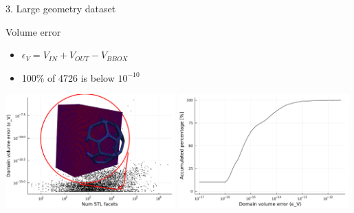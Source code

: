 \documentclass{beamer}
\begin{document}
\begin{frame}{3. Large geometry dataset}

  \begin{block}{Volume error}
  \begin{itemize}
    \item
      $\epsilon_V = V_{IN} + V_{OUT} - V_{BBOX}$
    \item
      100\% of 4726 is below $10^{-10}$
  \end{itemize}
  \end{block}

  \includegraphics[width=0.49\textwidth]{num_stl_facets_volume_error_509317}
  \includegraphics[width=0.49\textwidth]{../analysis/plots/histogram_volume_error}
\end{frame}

%
%
\end{document}
